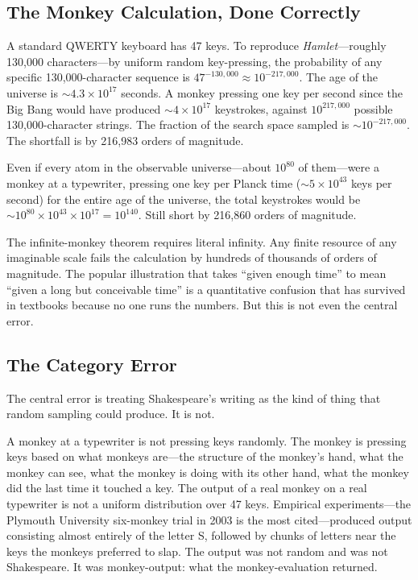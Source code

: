 \documentclass[11pt,twocolumn,a4paper]{article}
\theoremstyle{definition}
\theoremstyle{remark}
\begin{document}
\subsection{The Monkey Calculation, Done Correctly}

A standard QWERTY keyboard has 47 keys.  To reproduce \textit{Hamlet}---roughly
130{,}000 characters---by uniform random key-pressing, the probability of any
specific 130{,}000-character sequence is $47^{-130{,}000} \approx
10^{-217{,}000}$.  The age of the universe is $\sim\!4.3\times10^{17}$
seconds.  A monkey pressing one key per second since the Big Bang would have
produced $\sim\!4\times10^{17}$ keystrokes, against $10^{217{,}000}$ possible
130{,}000-character strings.  The fraction of the search space sampled is
$\sim\!10^{-217{,}000}$.  The shortfall is by 216{,}983 orders of magnitude.

Even if every atom in the observable universe---about $10^{80}$ of them---were
a monkey at a typewriter, pressing one key per Planck time
($\sim\!5\times10^{43}$ keys per second) for the entire age of the universe,
the total keystrokes would be $\sim\!10^{80} \times 10^{43} \times 10^{17} =
10^{140}$.  Still short by 216{,}860 orders of magnitude.

The infinite-monkey theorem requires literal infinity.  Any finite resource of
any imaginable scale fails the calculation by hundreds of thousands of orders
of magnitude.  The popular illustration that takes ``given enough time'' to
mean ``given a long but conceivable time'' is a quantitative confusion that has
survived in textbooks because no one runs the numbers.  But this is not even
the central error.

\subsection{The Category Error}

The central error is treating Shakespeare's writing as the kind of thing that
random sampling could produce.  It is not.

A monkey at a typewriter is not pressing keys randomly.  The monkey is pressing
keys based on what monkeys are---the structure of the monkey's hand, what the
monkey can see, what the monkey is doing with its other hand, what the monkey
did the last time it touched a key.  The output of a real monkey on a real
typewriter is not a uniform distribution over 47 keys.  Empirical
experiments---the Plymouth University six-monkey trial in 2003 is the most
cited---produced output consisting almost entirely of the letter S, followed
by chunks of letters near the keys the monkeys preferred to slap.  The output
was not random and was not Shakespeare.  It was monkey-output: what the
monkey-evaluation returned.
\end{document}
